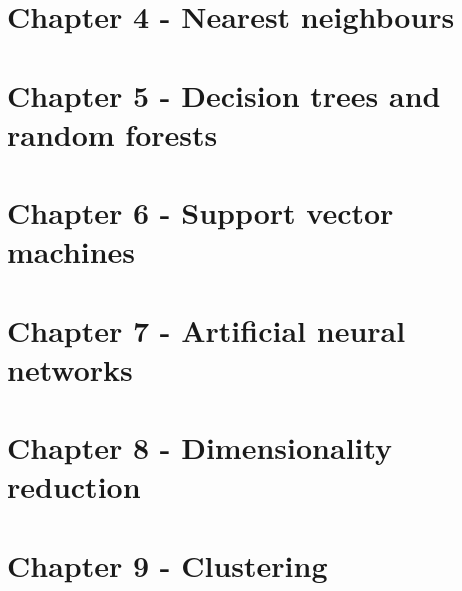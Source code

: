 \documentclass[]{book}
\theoremstyle{definition}
\theoremstyle{definition}
\theoremstyle{definition}
\theoremstyle{remark}
\begin{document}
\section{Chapter 4 - Nearest
neighbours}\label{solutions-nearest-neighbours}

\section{Chapter 5 - Decision trees and random
forests}\label{solutions-decision-trees}

\section{Chapter 6 - Support vector machines}\label{solutions-svm}

\section{Chapter 7 - Artificial neural networks}\label{solutions-ann}

\section{Chapter 8 - Dimensionality
reduction}\label{solutions-dimensionality-reduction}

\section{Chapter 9 - Clustering}\label{solutions-clustering}


\end{document}
